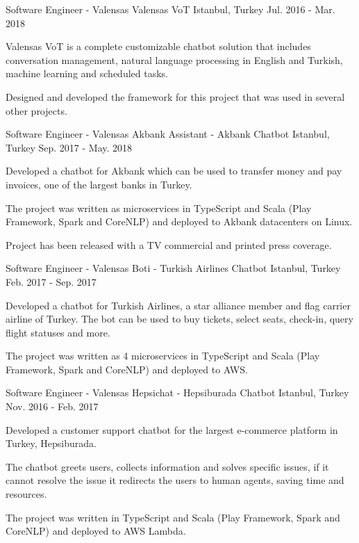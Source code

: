 \begin{cventries}
  \cventry
    {Software Engineer - Valensas}
    {Valensas VoT}
    {Istanbul, Turkey}
    {Jul. 2016 - Mar. 2018}
    {
      \begin{cvitems}
        \item {Valensas VoT is a complete customizable chatbot solution that includes conversation management, natural language processing in English and Turkish, machine learning and scheduled tasks.}
        \item {Designed and developed the framework for this project that was used in several other projects.}
      \end{cvitems}
    }   
    
  \cventry
    {Software Engineer - Valensas}
    {Akbank Assistant - Akbank Chatbot}
    {Istanbul, Turkey}
    {Sep. 2017 - May. 2018}
    {
      \begin{cvitems}
        \item {Developed a chatbot for Akbank which can be used to transfer money and pay invoices, one of the largest banks in Turkey.}
        \item {The project was written as microservices in TypeScript and Scala (Play Framework, Spark and CoreNLP) and deployed to Akbank datacenters on Linux.}
        \item {Project has been released with a TV commercial and printed press coverage.}
      \end{cvitems}
    }

  \cventry
    {Software Engineer - Valensas}
    {Boti - Turkish Airlines Chatbot}
    {Istanbul, Turkey}
    {Feb. 2017 - Sep. 2017}
    {
      \begin{cvitems}
        \item {Developed a chatbot for Turkish Airlines, a star alliance member and flag carrier airline of Turkey. The bot can be used to buy tickets, select seats, check-in, query flight statuses and more.}
        \item {The project was written as 4 microservices in TypeScript and Scala (Play Framework, Spark and CoreNLP) and deployed to AWS.}
      \end{cvitems}
    }

  \cventry
    {Software Engineer - Valensas}
    {Hepsichat - Hepsiburada Chatbot}
    {Istanbul, Turkey}
    {Nov. 2016 - Feb. 2017}
    {
      \begin{cvitems}
        \item {Developed a customer support chatbot for the largest e-commerce platform in Turkey, Hepsiburada.}
        \item {The chatbot greets users, collects information and solves specific issues, if it cannot resolve the issue it redirects the users to human agents, saving time and resources.}
        \item {The project was written in TypeScript and Scala (Play Framework, Spark and CoreNLP) and deployed to AWS Lambda.}
      \end{cvitems}
    }


\end{cventries}
